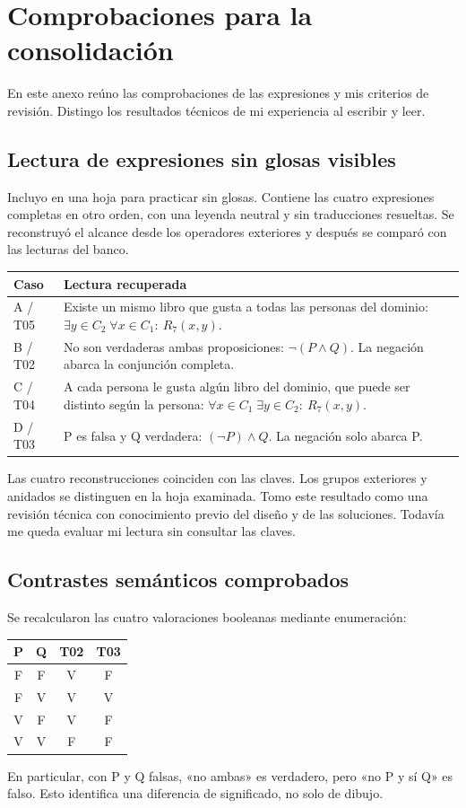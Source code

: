 \section{Comprobaciones para la consolidación}\label{sec:comprobaciones}
En este anexo reúno las comprobaciones de las expresiones y mis criterios de
revisión. Distingo los resultados técnicos de mi experiencia al escribir y leer.

\subsection{Lectura de expresiones sin glosas visibles}
Incluyo en  una hoja para practicar sin glosas. Contiene
las cuatro expresiones completas en otro orden, con una leyenda neutral y sin
traducciones resueltas. Se reconstruyó el alcance desde los operadores exteriores
y después se comparó con las lecturas del banco.

\begin{longtable}{@{}p{18mm}>{\raggedright\arraybackslash}p{\dimexpr\linewidth-18mm-2\tabcolsep\relax}@{}}
\toprule Caso & Lectura recuperada \\ \midrule\endhead
A / T05 & Existe un mismo libro que gusta a todas las personas del dominio:
\(\exists y\in C_2\;\forall x\in C_1:\ R_7(x,y)\). \\[4pt]
B / T02 & No son verdaderas ambas proposiciones:
\(\neg(P\land Q)\). La negación abarca la conjunción completa. \\[4pt]
C / T04 & A cada persona le gusta algún libro del dominio, que puede ser
distinto según la persona: \(\forall x\in C_1\;\exists y\in C_2:\ R_7(x,y)\). \\[4pt]
D / T03 & P es falsa y Q verdadera:
\((\neg P)\land Q\). La negación solo abarca P. \\[4pt]
\bottomrule
\end{longtable}
Las cuatro reconstrucciones coinciden con las claves. Los grupos exteriores
y anidados se distinguen en la hoja examinada. Tomo este resultado como una
revisión técnica con conocimiento previo del diseño y de las soluciones.
Todavía me queda evaluar mi lectura sin consultar las claves.

\subsection{Contrastes semánticos comprobados}
Se recalcularon las cuatro valoraciones booleanas mediante enumeración:
\begin{center}\begin{tabular}{cccc}
\toprule P & Q & T02 & T03 \\ \midrule
F & F & V & F \\
F & V & V & V \\
V & F & V & F \\
V & V & F & F \\
\bottomrule\end{tabular}\end{center}
En particular, con P y Q falsas, «no ambas» es verdadero, pero «no P y sí Q»
es falso. Esto identifica una diferencia de significado, no solo de dibujo.

